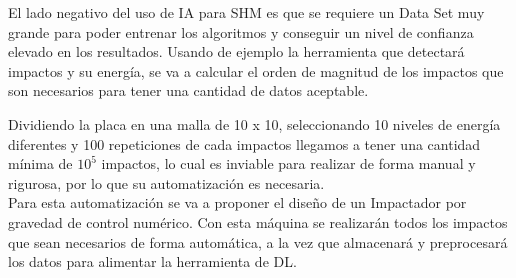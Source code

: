 El lado negativo del uso de IA para SHM es que se requiere un Data Set muy grande para poder entrenar los algoritmos y conseguir un nivel de confianza elevado en los resultados. Usando de ejemplo la herramienta que detectará impactos y su energía, se va a calcular el orden de magnitud de los impactos que son necesarios para tener una cantidad de datos aceptable.

Dividiendo la placa en una malla de 10 x 10, seleccionando 10 niveles de energía diferentes y 100 repeticiones de cada impactos llegamos a tener una cantidad mínima de $10^5$ impactos, lo cual es inviable para realizar de forma manual y rigurosa, por lo que su automatización es necesaria.\\

Para esta automatización se va a proponer el diseño de un Impactador por gravedad de control numérico. Con esta máquina se realizarán todos los impactos que sean necesarios de forma automática, a la vez que almacenará y preprocesará los datos para alimentar la herramienta de DL.
